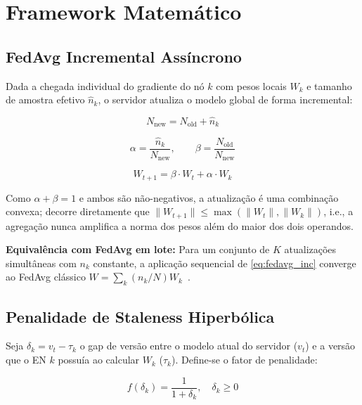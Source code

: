 \documentclass[conference,a4paper]{IEEEtran}
\begin{document}
\section{Framework Matemático}
\label{sec:math}

\subsection{FedAvg Incremental Assíncrono}

Dada a chegada individual do gradiente do nó $k$ com pesos locais $W_k$ e
tamanho de amostra efetivo $\hat{n}_k$, o servidor atualiza o modelo global de
forma incremental:

\begin{equation}
N_{\text{new}} = N_{\text{old}} + \hat{n}_k
\label{eq:new_total}
\end{equation}

\begin{equation}
\alpha = \frac{\hat{n}_k}{N_{\text{new}}}, \qquad
\beta  = \frac{N_{\text{old}}}{N_{\text{new}}}
\label{eq:alpha_beta}
\end{equation}

\begin{equation}
\boxed{W_{t+1} = \beta \cdot W_t + \alpha \cdot W_k}
\label{eq:fedavg_inc}
\end{equation}

\noindent Como $\alpha + \beta = 1$ e ambos são não-negativos, a atualização
é uma combinação convexa; decorre diretamente que
$\|W_{t+1}\| \leq \max(\|W_t\|, \|W_k\|)$, i.e., a agregação nunca amplifica
a norma dos pesos além do maior dos dois operandos.

\noindent \textbf{Equivalência com FedAvg em lote:} Para um conjunto de $K$
atualizações simultâneas com $n_k$ constante, a aplicação sequencial de
\eqref{eq:fedavg_inc} converge ao FedAvg clássico
$W = \sum_k (n_k/N) W_k$~\cite{mcmahan2017}.

\subsection{Penalidade de Staleness Hiperbólica}

Seja $\delta_k = v_t - \tau_k$ o gap de versão entre o modelo atual
do servidor ($v_t$) e a versão que o EN $k$ possuía ao calcular $W_k$
($\tau_k$). Define-se o fator de penalidade:

\begin{equation}
f(\delta_k) = \frac{1}{1 + \delta_k}, \quad \delta_k \geq 0
\label{eq:staleness}
\end{equation}
\end{document}
